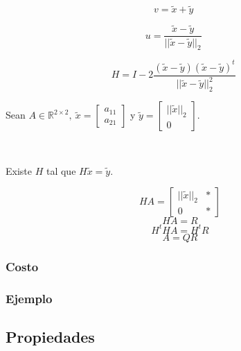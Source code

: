 \begin{multicols}{2}
    \begin{center}    
    \end{center} 

    \[v = \tilde{x} + \tilde{y}~~~~~~\]

    \[u = \frac{\tilde{x} - \tilde{y}}{{||\tilde{x}-\tilde{y}||}_{2}}~~~~~~\]

    \[H = I - 2\frac{(\tilde{x}-\tilde{y}){(\tilde{x}-\tilde{y})}^{t}}{{||\tilde{x}-\tilde{y}||}_{2}^{2}}~~~~~~\]
\end{multicols}



\noindent Sean $A \in \mathbb{R}^{2 \times 2},~\tilde{x}=\begin{bmatrix}
    a_{11} \\ a_{21}
\end{bmatrix}$ y $\tilde{y} = \begin{bmatrix}
    {||\tilde{x}||}_{2} \\ 0
\end{bmatrix}$.

\

\noindent Existe $H$ tal que $H\tilde{x} = \tilde{y}$.

 \[HA = \begin{bmatrix}
    {||\tilde{x}||}_{2} & * \\
    0 & *
 \end{bmatrix}\]
 \[HA = R\]
 \[H^{t}HA = H^{t}R\]
 \[A = QR\]

\subsubsection{Costo}\label{subsubsec:householder_costo}

\subsubsection{Ejemplo}\label{subsubsec:householder_ejemplo}

\subsection{Propiedades}\label{subsec:propiedades_qr}